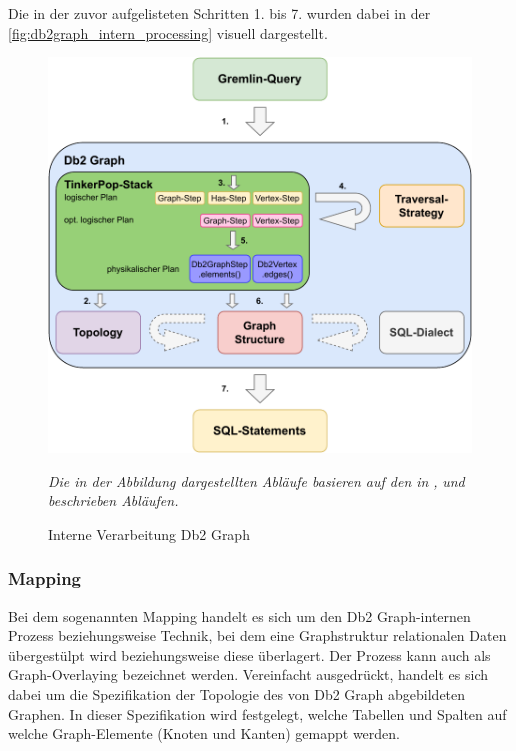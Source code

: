 Die in der zuvor aufgelisteten Schritten 1. bis 7. wurden dabei in der \autoref{fig:db2graph_intern_processing} visuell dargestellt.

\begin{figure}[ht]
    \centering
    \includegraphics[width=\textwidth]{images/db2graph_intern_processing.pdf}
    \caption{Interne Verarbeitung Db2 Graph}
    \label{fig:db2graph_intern_processing}
    \vspace{1em}
    \textit{Die in der Abbildung dargestellten Abläufe basieren auf den in} \cite{yt_tian}\textit{,} \cite{vldb_tian} \textit{und} \cite{sigmod_tian} \textit{beschrieben Abläufen.} 
\end{figure}

\subsubsection{Mapping}
Bei dem sogenannten Mapping handelt es sich um den Db2 Graph-internen Prozess beziehungsweise Technik, bei dem eine Graphstruktur relationalen Daten übergestülpt wird beziehungsweise diese überlagert. Der Prozess kann auch als Graph-Overlaying bezeichnet werden. Vereinfacht ausgedrückt, handelt es sich dabei um die Spezifikation der Topologie des von Db2 Graph abgebildeten Graphen. In dieser Spezifikation wird festgelegt, welche Tabellen und Spalten auf welche Graph-Elemente (Knoten und Kanten) gemappt werden. 


